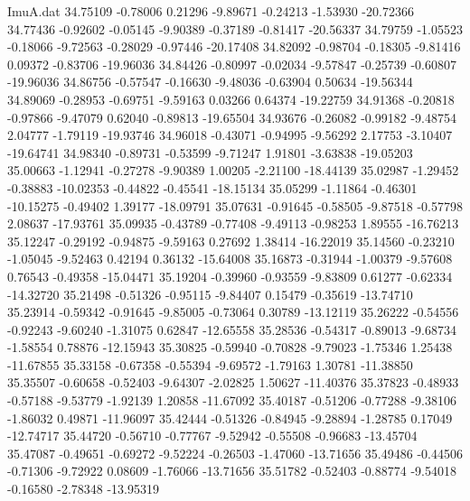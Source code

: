 \begin{filecontents}{ImuA.dat}
  34.75109   -0.78006    0.21296   -9.89671   -0.24213   -1.53930  -20.72366
  34.77436   -0.92602   -0.05145   -9.90389   -0.37189   -0.81417  -20.56337
  34.79759   -1.05523   -0.18066   -9.72563   -0.28029   -0.97446  -20.17408
  34.82092   -0.98704   -0.18305   -9.81416    0.09372   -0.83706  -19.96036
  34.84426   -0.80997   -0.02034   -9.57847   -0.25739   -0.60807  -19.96036
  34.86756   -0.57547   -0.16630   -9.48036   -0.63904    0.50634  -19.56344
  34.89069   -0.28953   -0.69751   -9.59163    0.03266    0.64374  -19.22759
  34.91368   -0.20818   -0.97866   -9.47079    0.62040   -0.89813  -19.65504
  34.93676   -0.26082   -0.99182   -9.48754    2.04777   -1.79119  -19.93746
  34.96018   -0.43071   -0.94995   -9.56292    2.17753   -3.10407  -19.64741
  34.98340   -0.89731   -0.53599   -9.71247    1.91801   -3.63838  -19.05203
  35.00663   -1.12941   -0.27278   -9.90389    1.00205   -2.21100  -18.44139
  35.02987   -1.29452   -0.38883  -10.02353   -0.44822   -0.45541  -18.15134
  35.05299   -1.11864   -0.46301  -10.15275   -0.49402    1.39177  -18.09791
  35.07631   -0.91645   -0.58505   -9.87518   -0.57798    2.08637  -17.93761
  35.09935   -0.43789   -0.77408   -9.49113   -0.98253    1.89555  -16.76213
  35.12247   -0.29192   -0.94875   -9.59163    0.27692    1.38414  -16.22019
  35.14560   -0.23210   -1.05045   -9.52463    0.42194    0.36132  -15.64008
  35.16873   -0.31944   -1.00379   -9.57608    0.76543   -0.49358  -15.04471
  35.19204   -0.39960   -0.93559   -9.83809    0.61277   -0.62334  -14.32720
  35.21498   -0.51326   -0.95115   -9.84407    0.15479   -0.35619  -13.74710
  35.23914   -0.59342   -0.91645   -9.85005   -0.73064    0.30789  -13.12119
  35.26222   -0.54556   -0.92243   -9.60240   -1.31075    0.62847  -12.65558
  35.28536   -0.54317   -0.89013   -9.68734   -1.58554    0.78876  -12.15943
  35.30825   -0.59940   -0.70828   -9.79023   -1.75346    1.25438  -11.67855
  35.33158   -0.67358   -0.55394   -9.69572   -1.79163    1.30781  -11.38850
  35.35507   -0.60658   -0.52403   -9.64307   -2.02825    1.50627  -11.40376
  35.37823   -0.48933   -0.57188   -9.53779   -1.92139    1.20858  -11.67092
  35.40187   -0.51206   -0.77288   -9.38106   -1.86032    0.49871  -11.96097
  35.42444   -0.51326   -0.84945   -9.28894   -1.28785    0.17049  -12.74717
  35.44720   -0.56710   -0.77767   -9.52942   -0.55508   -0.96683  -13.45704
  35.47087   -0.49651   -0.69272   -9.52224   -0.26503   -1.47060  -13.71656
  35.49486   -0.44506   -0.71306   -9.72922    0.08609   -1.76066  -13.71656
  35.51782   -0.52403   -0.88774   -9.54018   -0.16580   -2.78348  -13.95319

\end{filecontents}
